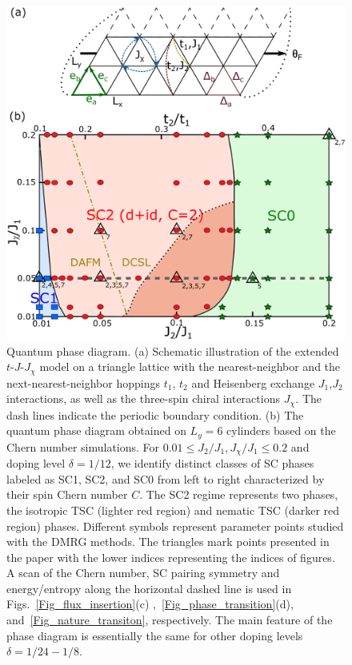 \documentclass[aps,prx,reprint,superscriptaddress,showpacs]{revtex4-2}
\newcommand{\oim}[1]{{\color{blue} #1}}
\begin{document}
\begin{figure}
\centering
\includegraphics[width=1\linewidth]{Phase_diagram_v3.pdf}
\caption{Quantum phase diagram. (a) Schematic illustration of the extended $t$-$J$-$J_{\chi}$ model on a triangle lattice with the nearest-neighbor and the next-nearest-neighbor hoppings $t_{1}$, $t_{2}$ and Heisenberg exchange $J_{1}$,$J_{2}$ interactions, as well as the three-spin chiral interactions $J_{\chi}$. The dash lines indicate  the periodic boundary condition. (b) The quantum phase diagram obtained on  $L_{y}=6$ cylinders  based on the Chern number simulations. For  $0.01 \leq J_{2}/J_{1}, J_{\chi}/J_{1} \leq 0.2$   and doping level  $\delta=1/12$, \oim {we identify distinct classes of SC phases  labeled as SC1, SC2, and SC0 from left to right characterized  by their spin Chern number $C$. The SC2 regime represents two phases, the isotropic TSC (lighter red region) and nematic TSC  (darker red region) phases. Different symbols represent parameter points studied
with the DMRG methods.  The triangles mark  points  presented in the paper with the lower indices representing the indices of figures.  A scan of the Chern number, SC pairing symmetry and energy/entropy along the horizontal dashed line is used in Figs.~\ref{Fig_flux_insertion}(c) ,~\ref{Fig_phase_transition}(d), and~\ref{Fig_nature_transiton}, respectively. The main feature of the phase diagram is essentially the same for other doping levels $\delta=1/24-1/8$.}}
\label{Fig_phase_diagram}
\end{figure}
\end{document}
